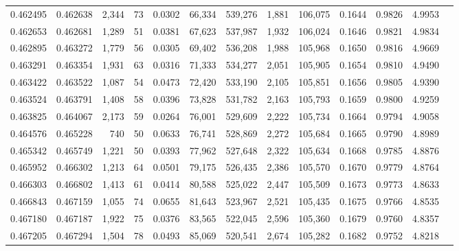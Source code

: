 \begin{tabular}{rrrrrrrrrrrrr}
0.462495 & 0.462638 & 2,344 &    73 &                                     0.0302 &  66,334 & 539,276 &   1,881 & 106,075 & 0.1644 & 0.9826 & 4.9953 \\
0.462653 & 0.462681 & 1,289 &    51 &                                     0.0381 &  67,623 & 537,987 &   1,932 & 106,024 & 0.1646 & 0.9821 & 4.9834 \\
0.462895 & 0.463272 & 1,779 &    56 &                                     0.0305 &  69,402 & 536,208 &   1,988 & 105,968 & 0.1650 & 0.9816 & 4.9669 \\
0.463291 & 0.463354 & 1,931 &    63 &                                     0.0316 &  71,333 & 534,277 &   2,051 & 105,905 & 0.1654 & 0.9810 & 4.9490 \\
0.463422 & 0.463522 & 1,087 &    54 &                                     0.0473 &  72,420 & 533,190 &   2,105 & 105,851 & 0.1656 & 0.9805 & 4.9390 \\
0.463524 & 0.463791 & 1,408 &    58 &                                     0.0396 &  73,828 & 531,782 &   2,163 & 105,793 & 0.1659 & 0.9800 & 4.9259 \\
0.463825 & 0.464067 & 2,173 &    59 &                                     0.0264 &  76,001 & 529,609 &   2,222 & 105,734 & 0.1664 & 0.9794 & 4.9058 \\
0.464576 & 0.465228 &   740 &    50 &                                     0.0633 &  76,741 & 528,869 &   2,272 & 105,684 & 0.1665 & 0.9790 & 4.8989 \\
0.465342 & 0.465749 & 1,221 &    50 &                                     0.0393 &  77,962 & 527,648 &   2,322 & 105,634 & 0.1668 & 0.9785 & 4.8876 \\
0.465952 & 0.466302 & 1,213 &    64 &                                     0.0501 &  79,175 & 526,435 &   2,386 & 105,570 & 0.1670 & 0.9779 & 4.8764 \\
0.466303 & 0.466802 & 1,413 &    61 &                                     0.0414 &  80,588 & 525,022 &   2,447 & 105,509 & 0.1673 & 0.9773 & 4.8633 \\
0.466843 & 0.467159 & 1,055 &    74 &                                     0.0655 &  81,643 & 523,967 &   2,521 & 105,435 & 0.1675 & 0.9766 & 4.8535 \\
0.467180 & 0.467187 & 1,922 &    75 &                                     0.0376 &  83,565 & 522,045 &   2,596 & 105,360 & 0.1679 & 0.9760 & 4.8357 \\
0.467205 & 0.467294 & 1,504 &    78 &                                     0.0493 &  85,069 & 520,541 &   2,674 & 105,282 & 0.1682 & 0.9752 & 4.8218 \\

\end{tabular}
